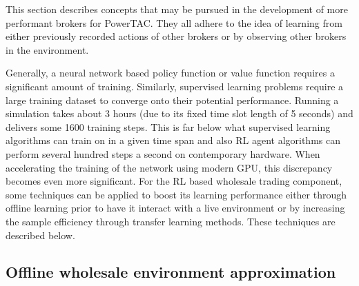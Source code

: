 This section describes concepts that may be pursued in the development of more performant brokers for
\ac{PowerTAC}. They all adhere to the idea of learning from either previously recorded actions of other brokers or by
observing other brokers in the environment.

Generally, a neural network based policy function or value function requires a significant amount of training.
Similarly, supervised learning problems require a large training dataset to converge onto their potential performance.
Running a simulation takes about 3 hours (due to its fixed time slot length of 5 seconds) and delivers some 1600
training steps. This is far below what supervised learning algorithms can train on in a given time span and also \ac{RL}
agent algorithms can perform several hundred steps a second on contemporary hardware. When accelerating the training of
the network using modern \ac{GPU}, this discrepancy becomes even more significant. For the \ac{RL} based wholesale
trading component, some techniques can be applied to boost its learning performance either through offline learning
prior to have it interact with a live environment or by increasing the sample efficiency through transfer learning
methods. These techniques are described below.

\subsection{Offline wholesale environment approximation}%
\label{ssub:offline_record_based_wholesale_environment_approximation}

